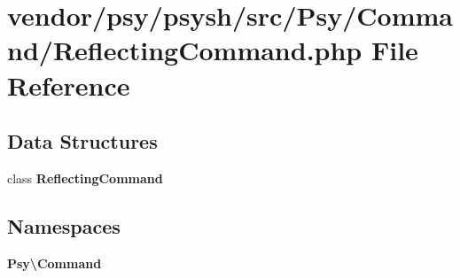 \section{vendor/psy/psysh/src/\+Psy/\+Command/\+Reflecting\+Command.php File Reference}
\label{_reflecting_command_8php}
\subsection*{Data Structures}
\begin{DoxyCompactItemize}
\item 
class {\bf Reflecting\+Command}
\end{DoxyCompactItemize}
\subsection*{Namespaces}
\begin{DoxyCompactItemize}
\item 
 {\bf Psy\textbackslash{}\+Command}
\end{DoxyCompactItemize}
